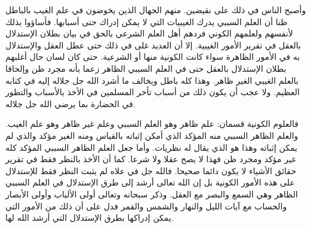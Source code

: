 وأصبح الناس في ذلك على نقيضين. منهم الجهال الذين يخوضون في علم الغيب بالباطل ظنا أن العلم السببي يدرك الغيبيات التي لا يمكن إدراك حتى أسبابها. فأساؤوا بذلك لأنفسهم ولعلمهم الكوني فردهم أهل العلم الشرعي بالحق في بيان بطلان الإستدلال بالعقل في تقرير الأمور الغيبية. إلا أن العديد غلى في ذلك حتى عطل العقل والإستدلال به في الأمور الظاهرة سواء كانت الكونية منها أو الشرعية. حتى كان لسان حال أغلبهم بطلان الإستدلال بالعقل حتى في العلم السببي الظاهر زعما بأنه مجرد ظن وإلحاقا بالعلم الغيبي الغير ظاهر. وهذا كله باطل ويخالف ما أشرد الله جل جلاله إليه في كتابه العظيم. ولا عجب أن يكون ذلك من أسباب تأخر المسلمين في الأخذ بالأسباب والتطور في الحضارة بما يرضي الله جل جلاله.

فالعلوم الكونية قسمان: علم ظاهر وهو العلم السببي وعلم غير ظاهر وهو علم الغيب. والعلم الظاهر السببي منه المؤكد الذي أمكن إثباته بالقياس ومنه الغير مؤكد والذي لم يمكن إثباته وهذا هو الذي يقال له نظريات. وأما جعل العلم الظاهر السببي المؤكد كله غير مؤكد ومجرد ظن فهذا لا يصح عقلا ولا شرعا. كما أن الأخذ بالنظر فقط في تقرير حقائق الأشياء لا يكون دائما صحيحا. فالله جل في علاه لم يثبت النظر فقط للإستدلال على هذه الأمور الكونية بل إن الله تعالى أرشد إلى طرق الإستدلال في العلم السببي الظاهر وهي السمع والبصر مع العقل. وذكر سبحانه وتعالى أولى الألباب وأولى الأبصار والحساب مع آيات الليل والنهار والشمس والقمر فدل على أن ذلك من الأمور التي يمكن إدراكها بطرق الإستدلال التي أرشد الله لها.

